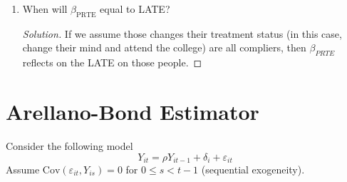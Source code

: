 \documentclass[11pt]{article}
\newenvironment{solution}{%
  \renewcommand\qedsymbol{$\blacksquare$}%
  \begin{mdframed}[backgroundcolor=gray!15]%
  \begin{proof}[Solution]}%
  {\end{proof}%
  \end{mdframed}}%
\begin{document}
\begin{enumerate}
        \item When will $\beta_{\text{PRTE}}$ equal to LATE?
        
            \begin{solution}
                If we assume those changes their treatment status (in this case, change their mind and attend the college) are all compliers, then $\beta_{PRTE}$ reflects on the LATE on those people.
            \end{solution}

    \end{enumerate}

        
\section{Arellano-Bond Estimator}

    Consider the following model
    \[ 
        Y_{it} = \rho Y_{it-1} + \delta_i + \varepsilon_{it} 
    \]
    Assume \( \text{Cov}(\varepsilon_{it}, Y_{is}) = 0 \) for \( 0 \leq s < t-1 \) (sequential exogeneity).
\end{document}
